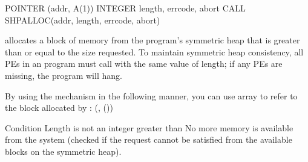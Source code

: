 \synF   %

POINTER (addr, A(1))
INTEGER length, errcode, abort
CALL SHPALLOC(addr, length, errcode, abort) %

 {   
        allocates a block of memory from the program's symmetric heap
       that is greater than or equal to the size requested. To maintain symmetric heap 
       consistency, all \ac{PE}s in an program must call  with the same value of length; if any  \ac{PE}s are missing, the program will hang.
       
       By using the \Fortran{}  mechanism in the following manner, you can use array  to refer to the block allocated by :  (,
       ())
  }
{
{
\desR{ }
 {Condition}
 {Length is not an integer greater than }
 { No more memory is available from the system (checked if the  request cannot be satisfied from the available blocks on the symmetric heap).}
}%
}
\eAPI 
